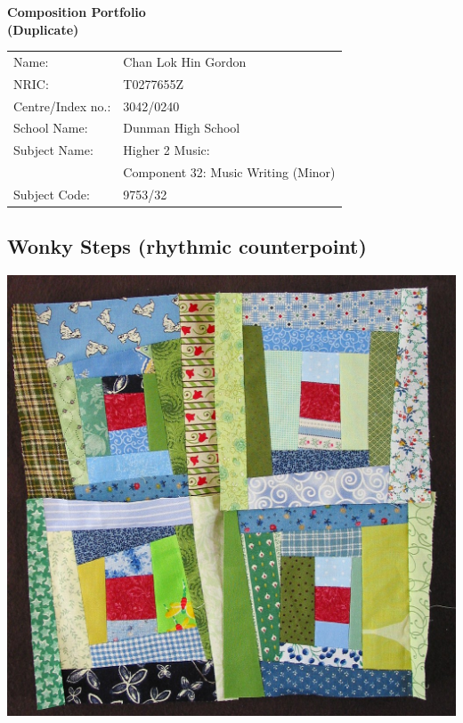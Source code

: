 \documentclass{article}
\begin{document}
\begin{center}
\vspace*{\fill}
\LARGE
    {\bf Composition Portfolio\\
    (Duplicate)}
\vspace*{\fill}
%
\end{center}
\begin{center}
    \large
\begin{tabular}{ll}
    Name: &Chan Lok Hin Gordon\\
    NRIC: &T0277655Z\\
    Centre/Index no.: &3042/0240\\
    School Name: &Dunman High School\\
    Subject Name: &Higher 2 Music:\\
    &Component 32: Music Writing (Minor)\\
    Subject Code: &9753/32
\end{tabular}
\end{center}

\newpage

\tableofcontents

\newpage

\begin{center}
\vspace*{\fill}
\LARGE
    \section{Wonky Steps (rhythmic counterpoint)}
    \includegraphics[width=\textwidth]{wonk.jpg}
\vspace*{\fill}
%
\end{center}
\end{document}
